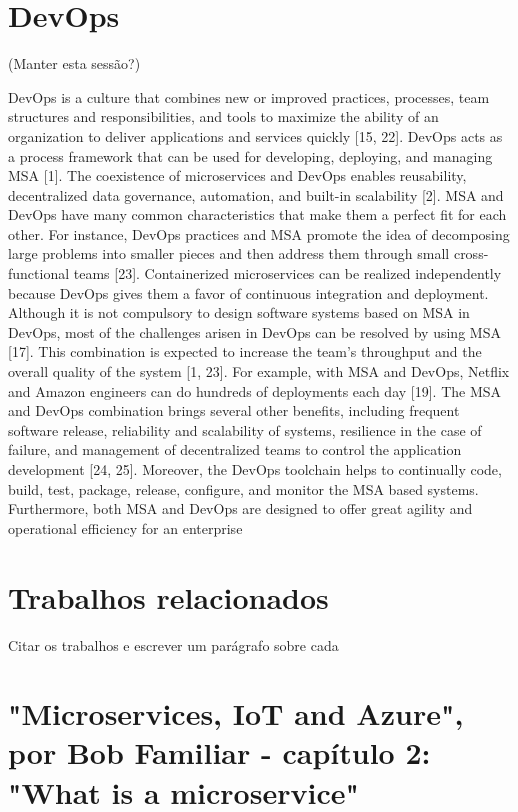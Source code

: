 \section{DevOps}
\label{devops}

(Manter esta sessão?)

DevOps is a culture that combines new or improved practices, processes, team structures and responsibilities, and tools to maximize the ability of an organization to deliver applications and services quickly [15, 22]. DevOps acts as a process framework that can be used for developing, deploying, and managing MSA [1]. The coexistence of microservices and DevOps enables reusability, decentralized data governance, automation, and built-in scalability [2]. MSA and DevOps have many common characteristics that make them a perfect fit for each other. For instance, DevOps practices and MSA promote the idea of decomposing large problems into smaller pieces and then address them through small cross-functional teams [23]. Containerized microservices can be realized independently because DevOps gives them a favor of continuous integration and deployment. Although it is not compulsory to design software systems based on MSA in DevOps, most of the challenges arisen in DevOps can be resolved by using MSA [17]. This combination is expected to increase the team’s throughput and the overall quality of the system [1, 23]. For example, with MSA and DevOps, Netflix and Amazon engineers can do hundreds of deployments each day [19]. The MSA and DevOps combination brings several other benefits, including frequent software release, reliability and scalability of systems, resilience in the case of failure, and management of decentralized teams to control the application development [24, 25]. Moreover, the DevOps toolchain helps to continually code, build, test, package, release, configure, and monitor the MSA based systems. Furthermore, both MSA and DevOps are designed to offer great agility and operational efficiency for an enterprise

\section{Trabalhos relacionados}

Citar os trabalhos e escrever um parágrafo sobre cada

\section*{"Microservices, IoT and Azure", por Bob Familiar - capítulo 2: "What is a microservice"}

